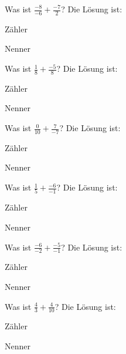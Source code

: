 \documentclass{ximera}
\begin{document}
\begin{shuffle}
\begin{question}
Was ist $\frac{-8}{-6} + \frac{-7}{2}$?
Die Lösung ist:
\begin{solution}
Zähler 
\end{solution}
\begin{solution}
Nenner 
\end{solution}
\end{question}


\begin{question}
Was ist $\frac{1}{8} + \frac{-5}{8}$?
Die Lösung ist:
\begin{solution}
Zähler 
\end{solution}
\begin{solution}
Nenner 
\end{solution}
\end{question}


\begin{question}
Was ist $\frac{0}{10} + \frac{7}{-7}$?
Die Lösung ist:
\begin{solution}
Zähler 
\end{solution}
\begin{solution}
Nenner 
\end{solution}
\end{question}


\begin{question}
Was ist $\frac{1}{5} + \frac{-6}{-1}$?
Die Lösung ist:
\begin{solution}
Zähler 
\end{solution}
\begin{solution}
Nenner 
\end{solution}
\end{question}


\begin{question}
Was ist $\frac{-6}{-2} + \frac{-5}{-1}$?
Die Lösung ist:
\begin{solution}
Zähler 
\end{solution}
\begin{solution}
Nenner 
\end{solution}
\end{question}


\begin{question}
Was ist $\frac{4}{3} + \frac{4}{10}$?
Die Lösung ist:
\begin{solution}
Zähler 
\end{solution}
\begin{solution}
Nenner 
\end{solution}
\end{question}



\end{shuffle}
\end{document}
